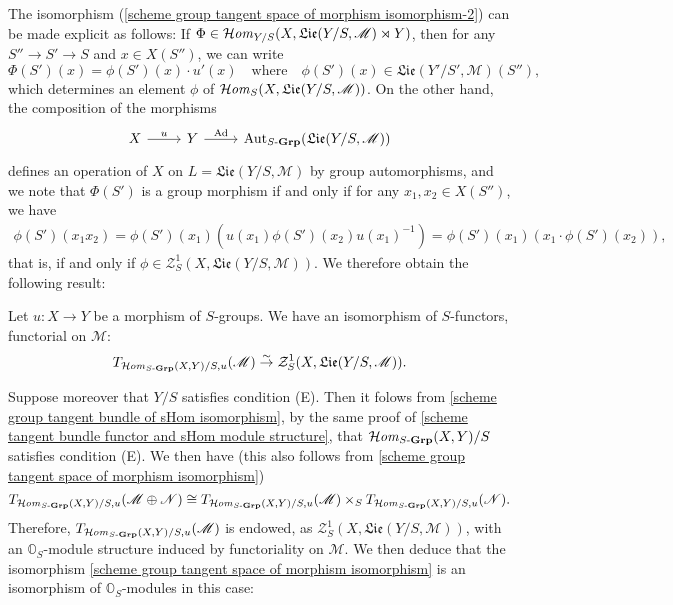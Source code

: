 The isomorphism (\ref{scheme group tangent space of morphism isomorphism-2}) can be made explicit as follows: If $\Phi\in\operatorname{\mathcal{H}\hspace*{-0.4pt}\textit{om}\hspace{0.5pt}}_{Y/S}(X,\mathfrak{Lie}(Y/S,\mathscr{M})\rtimes Y)$, then for any $S''\to S'\to S$ and $x\in X(S'')$, we can write
\[\Phi(S')(x)=\phi(S')(x)\cdot u'(x)\quad\text{where}\quad \phi(S')(x)\in\mathfrak{Lie}(Y'/S',\mathscr{M})(S''),\]
which determines an element $\phi$ of $\operatorname{\mathcal{H}\hspace*{-0.4pt}\textit{om}\hspace{0.5pt}}_S(X,\mathfrak{Lie}(Y/S,\mathscr{M}))$. On the other hand, the composition of the morphisms
\[\begin{tikzcd}
X\ar[r,"u"]&Y\ar[r,"\Ad"]&\Aut_{S\dash\Grp}(\mathfrak{Lie}(Y/S,\mathscr{M}))
\end{tikzcd}\]
defines an operation of $X$ on $L=\mathfrak{Lie}(Y/S,\mathscr{M})$ by group automorphisms, and we note that $\Phi(S')$ is a group morphism if and only if for any $x_1,x_2\in X(S'')$, we have
\begin{align*}
\phi(S')(x_1x_2)=\phi(S')(x_1)(u(x_1)\phi(S')(x_2)u(x_1)^{-1})=\phi(S')(x_1)(x_1\cdot\phi(S')(x_2)),
\end{align*}
that is, if and only if $\phi\in\mathcal{Z}_S^1(X,\mathfrak{Lie}(Y/S,\mathscr{M}))$. We therefore obtain the following result:

\begin{proposition}\label{scheme group tangent space of morphism isomorphism}
Let $u:X\to Y$ be a morphism of $S$-groups. We have an isomorphism of $S$-functors, functorial on $\mathscr{M}$:
\[T_{\operatorname{\mathcal{H}\hspace*{-0.4pt}\textit{om}\hspace{0.5pt}}_{S\textup{-}\mathbf{Grp}}(X,Y)/S,u}(\mathscr{M})\stackrel{\sim}{\to}\mathcal{Z}_S^1(X,\mathfrak{Lie}(Y/S,\mathscr{M})).\]
\end{proposition}

Suppose moreover that $Y/S$ satisfies condition (E). Then it folows from \cref{scheme group tangent bundle of sHom isomorphism}, by the same proof of \cref{scheme tangent bundle functor and sHom module structure}, that $\operatorname{\mathcal{H}\hspace*{-0.4pt}\textit{om}\hspace{0.5pt}}_{S\textup{-}\mathbf{Grp}}(X,Y)/S$ satisfies condition (E). We then have (this also follows from \cref{scheme group tangent space of morphism isomorphism})
\[T_{\operatorname{\mathcal{H}\hspace*{-0.4pt}\textit{om}\hspace{0.5pt}}_{S\textup{-}\mathbf{Grp}}(X,Y)/S,u}(\mathscr{M}\oplus\mathscr{N})\cong T_{\operatorname{\mathcal{H}\hspace*{-0.4pt}\textit{om}\hspace{0.5pt}}_{S\textup{-}\mathbf{Grp}}(X,Y)/S,u}(\mathscr{M})\times_ST_{\operatorname{\mathcal{H}\hspace*{-0.4pt}\textit{om}\hspace{0.5pt}}_{S\textup{-}\mathbf{Grp}}(X,Y)/S,u}(\mathscr{N}).\]
Therefore, $T_{\operatorname{\mathcal{H}\hspace*{-0.4pt}\textit{om}\hspace{0.5pt}}_{S\textup{-}\mathbf{Grp}}(X,Y)/S,u}(\mathscr{M})$ is endowed, as $\mathcal{Z}_S^1(X,\mathfrak{Lie}(Y/S,\mathscr{M}))$, with an $\mathbb{O}_S$-module structure induced by functoriality on $\mathscr{M}$. We then deduce that the isomorphism \cref{scheme group tangent space of morphism isomorphism} is an isomorphism of $\mathbb{O}_S$-modules in this case:

